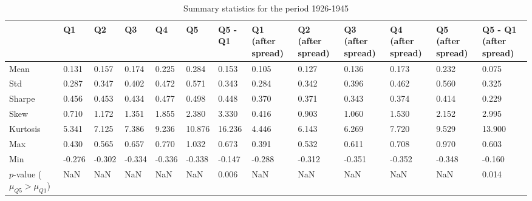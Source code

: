 \begin{table}
\caption{Summary statistics for the period 1926-1945}
\label{tab:summary_1926_1945}
\begin{tabular}{lllllllllllll}
\toprule
 & Q1 & Q2 & Q3 & Q4 & Q5 & Q5 - Q1 & Q1 (after spread) & Q2 (after spread) & Q3 (after spread) & Q4 (after spread) & Q5 (after spread) & Q5 - Q1 (after spread) \\
\midrule
Mean & 0.131 & 0.157 & 0.174 & 0.225 & 0.284 & 0.153 & 0.105 & 0.127 & 0.136 & 0.173 & 0.232 & 0.075 \\
Std & 0.287 & 0.347 & 0.402 & 0.472 & 0.571 & 0.343 & 0.284 & 0.342 & 0.396 & 0.462 & 0.560 & 0.325 \\
Sharpe & 0.456 & 0.453 & 0.434 & 0.477 & 0.498 & 0.448 & 0.370 & 0.371 & 0.343 & 0.374 & 0.414 & 0.229 \\
Skew & 0.710 & 1.172 & 1.351 & 1.855 & 2.380 & 3.330 & 0.416 & 0.903 & 1.060 & 1.530 & 2.152 & 2.995 \\
Kurtosis & 5.341 & 7.125 & 7.386 & 9.236 & 10.876 & 16.236 & 4.446 & 6.143 & 6.269 & 7.720 & 9.529 & 13.900 \\
Max & 0.430 & 0.565 & 0.657 & 0.770 & 1.032 & 0.673 & 0.391 & 0.532 & 0.611 & 0.708 & 0.970 & 0.603 \\
Min & -0.276 & -0.302 & -0.334 & -0.336 & -0.338 & -0.147 & -0.288 & -0.312 & -0.351 & -0.352 & -0.348 & -0.160 \\
$p$-value ($\mu_{Q5} > \mu_{Q1}$) & NaN & NaN & NaN & NaN & NaN & 0.006 & NaN & NaN & NaN & NaN & NaN & 0.014 \\
\bottomrule
\end{tabular}
\end{table}
